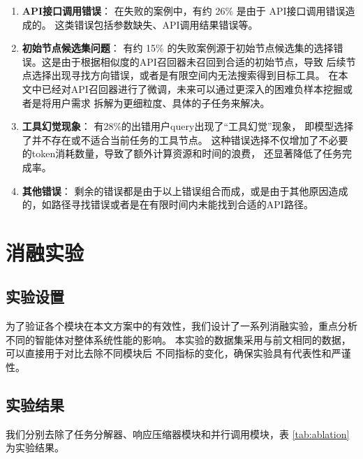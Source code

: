 \begin{enumerate}
    \item \textbf{API接口调用错误}：
    在失败的案例中，有约 26\% 是由于 API接口调用错误造成的。
    这类错误包括参数缺失、API调用结果错误等。

    \item \textbf{初始节点候选集问题}：
    有约 15\% 的失败案例源于初始节点候选集的选择错误。这是由于根据相似度的API召回器未召回到合适的初始节点，导致
    后续节点选择出现寻找方向错误，或者是有限空间内无法搜索得到目标工具。
    在本文中已经对API召回器进行了微调，未来可以通过更深入的困难负样本挖掘或者是将用户需求
    拆解为更细粒度、具体的子任务来解决。

    \item \textbf{工具幻觉现象}：
    有28\%的出错用户query出现了“工具幻觉”现象，
    即模型选择了并不存在或不适合当前任务的工具节点。
    这种错误选择不仅增加了不必要的token消耗数量，导致了额外计算资源和时间的浪费，
    还显著降低了任务完成率。

    \item \textbf{其他错误}：
    剩余的错误都是由于以上错误组合而成，或是由于其他原因造成的，如路径寻找错误或者是在有限时间内未能找到合适的API路径。

\end{enumerate}

\section{消融实验}

\subsection{实验设置}

为了验证各个模块在本文方案中的有效性，我们设计了一系列消融实验，重点分析
不同的智能体对整体系统性能的影响。
本实验的数据集采用与前文相同的数据，可以直接用于对比去除不同模块后
不同指标的变化，确保实验具有代表性和严谨性。

\subsection{实验结果}

我们分别去除了任务分解器、响应压缩器模块和并行调用模块，表 \ref{tab:ablation} 为实验结果。

